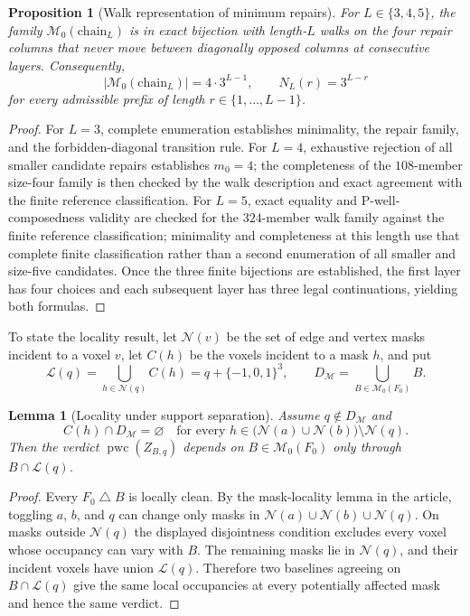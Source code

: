 \documentclass[11pt]{article}
\newcommand{\pwc}{\operatorname{pwc}}
\newtheorem{proposition}[theorem]{Proposition}
\newtheorem{lemma}[theorem]{Lemma}
\begin{document}
\begin{proposition}[Walk representation of minimum repairs]
\label{prop:finite-walk-precursor}
For $L\in\{3,4,5\}$, the family
$\mathcal M_0(\mathrm{chain}_L)$ is in exact bijection with length-$L$ walks
on the four repair columns that never move between diagonally opposed columns
at consecutive layers.  Consequently,
\[
 \lvert\mathcal M_0(\mathrm{chain}_L)\rvert=4\cdot3^{L-1},
 \qquad N_L(r)=3^{L-r}
\]
for every admissible prefix of length $r\in\{1,\ldots,L-1\}$.
\end{proposition}

\begin{proof}
For $L=3$, complete enumeration establishes minimality, the repair family, and the
forbidden-diagonal transition rule.  For $L=4$,
exhaustive rejection of all smaller candidate repairs establishes $m_0=4$;
the completeness of the $108$-member size-four family is then checked by the
walk description and exact agreement with the finite reference classification.  For
$L=5$, exact equality and P-well-composedness validity are checked for the
$324$-member walk family against the finite reference classification; minimality and
completeness at this length use that complete finite classification rather
than a second enumeration of all smaller and size-five candidates.
Once the three finite bijections are established, the first layer has four
choices and each subsequent layer has three legal continuations, yielding
both formulas.
\end{proof}

To state the locality result, let $\mathcal N(v)$ be the set of edge and
vertex masks incident to a voxel $v$, let $C(h)$ be the voxels incident to a
mask $h$, and put
\[
 \mathcal L(q)=\bigcup_{h\in\mathcal N(q)}C(h)
              =q+\{-1,0,1\}^3,
 \qquad
 D_{\mathcal M}=\bigcup_{B\in\mathcal M_0(F_0)}B.
\]

\begin{lemma}[Locality under support separation]
\label{lem:finite-precursor-localization}
Assume $q\notin D_{\mathcal M}$ and
\[
 C(h)\cap D_{\mathcal M}=\varnothing
 \quad\text{for every }h\in
 \bigl(\mathcal N(a)\cup\mathcal N(b)\bigr)\setminus\mathcal N(q).
\]
Then the verdict $\pwc(Z_{B,q})$ depends on
$B\in\mathcal M_0(F_0)$ only through $B\cap\mathcal L(q)$.
\end{lemma}

\begin{proof}
Every $F_0\mathbin{\triangle}B$ is locally clean.  By
the mask-locality lemma in the article, toggling $a$, $b$, and $q$ can change only masks
in $\mathcal N(a)\cup\mathcal N(b)\cup\mathcal N(q)$.  On masks outside
$\mathcal N(q)$ the displayed disjointness condition excludes every voxel
whose occupancy can vary with $B$.  The remaining masks lie in
$\mathcal N(q)$, and their incident voxels have union $\mathcal L(q)$.
Therefore two baselines agreeing on $B\cap\mathcal L(q)$ give the same local
occupancies at every potentially affected mask and hence the same verdict.
\end{proof}
\end{document}
